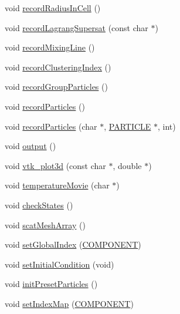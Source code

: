 \begin{DoxyCompactItemize}
\item 
void \hyperlink{class_v_c_a_r_t_e_s_i_a_n_a88e179e3f408a6fa858a06d979918a5a}{record\+Radius\+In\+Cell} ()
\item 
void \hyperlink{class_v_c_a_r_t_e_s_i_a_n_a0a45c37d020a1e5b829b69a9d8389bf5}{record\+Lagrang\+Supersat} (const char $\ast$)
\item 
void \hyperlink{class_v_c_a_r_t_e_s_i_a_n_a6a92703a1c2bf66e34f03f6a2cd7acfd}{record\+Mixing\+Line} ()
\item 
void \hyperlink{class_v_c_a_r_t_e_s_i_a_n_a6f6d1c1caba40c0dc78cbc750db05dc6}{record\+Clustering\+Index} ()
\item 
void \hyperlink{class_v_c_a_r_t_e_s_i_a_n_a3cc1c0f402434491bb21e4cedec0b47d}{record\+Group\+Particles} ()
\item 
void \hyperlink{class_v_c_a_r_t_e_s_i_a_n_a14f082df02ae80d904a6fb6a1164cf80}{record\+Particles} ()
\item 
void \hyperlink{class_v_c_a_r_t_e_s_i_a_n_a760895a52e61106d19a040c23a837cdb}{record\+Particles} (char $\ast$, \hyperlink{climate_8h_af4f40182b820265bf127f595fcf84143}{P\+A\+R\+T\+I\+C\+LE} $\ast$, int)
\item 
void \hyperlink{class_v_c_a_r_t_e_s_i_a_n_ace88d03a2ad4c95eb57e727efa0ecda6}{output} ()
\item 
void \hyperlink{class_v_c_a_r_t_e_s_i_a_n_a9da7a59744bd9c011c8c3a84072f9513}{vtk\+\_\+plot3d} (const char $\ast$, double $\ast$)
\item 
void \hyperlink{class_v_c_a_r_t_e_s_i_a_n_a972386695880d7064e3c57c0124de737}{temperature\+Movie} (char $\ast$)
\item 
void \hyperlink{class_v_c_a_r_t_e_s_i_a_n_a18c15e490ac5ef1769308ae4f538bab5}{check\+States} ()
\item 
void \hyperlink{class_v_c_a_r_t_e_s_i_a_n_a0cfe469707ec6e0e39b403c24e34d361}{scat\+Mesh\+Array} ()
\item 
void \hyperlink{class_v_c_a_r_t_e_s_i_a_n_a238e64123ed7e2a9aec272068236d7ac}{set\+Global\+Index} (\hyperlink{int_8h_a2bb7be12ca59ea6443c8757df0a7c278}{C\+O\+M\+P\+O\+N\+E\+NT})
\item 
void \hyperlink{class_v_c_a_r_t_e_s_i_a_n_ad8764e7e8a95bb4b8653fce2281b8a13}{set\+Initial\+Condition} (void)
\item 
void \hyperlink{class_v_c_a_r_t_e_s_i_a_n_a33b0933361e8806ec30d98bf4f59cb51}{init\+Preset\+Particles} ()
\item 
void \hyperlink{class_v_c_a_r_t_e_s_i_a_n_ac52a5315bd00c68488d1263b7056a8e2}{set\+Index\+Map} (\hyperlink{int_8h_a2bb7be12ca59ea6443c8757df0a7c278}{C\+O\+M\+P\+O\+N\+E\+NT})

\end{DoxyCompactItemize}
